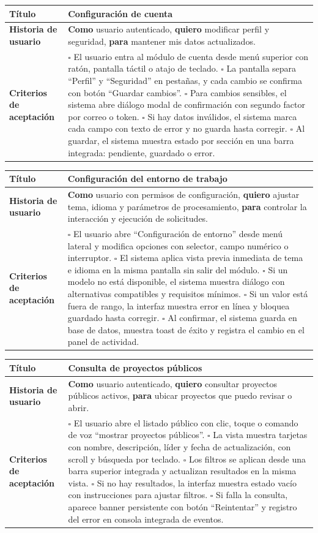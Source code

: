 \documentclass{article}
\newcommand{\story}[3]{
\begin{table}[H]
    \centering
    \begin{tabularx}{\textwidth}{| >{\raggedright\arraybackslash\bfseries\columncolor{leftheaderbg}}p{2.5cm} | >{\raggedright\arraybackslash\columncolor{contentbg}}X |}
        \hline
        Título & #1 \\
        \hline
        Historia de usuario & #2 \\
        \hline
        Criterios de aceptación & #3 \\
        \hline
    \end{tabularx}
\end{table}
}
\begin{document}
\story
{Configuración de cuenta}
{\textbf{Como} usuario autenticado, \textbf{quiero} modificar perfil y seguridad, \textbf{para} mantener mis datos actualizados.}
{$\square$ El usuario entra al módulo de cuenta desde menú superior con ratón, pantalla táctil o atajo de teclado. \newline
$\square$ La pantalla separa ``Perfil'' y ``Seguridad'' en pestañas, y cada cambio se confirma con botón ``Guardar cambios''. \newline
$\square$ Para cambios sensibles, el sistema abre diálogo modal de confirmación con segundo factor por correo o token. \newline
$\square$ Si hay datos inválidos, el sistema marca cada campo con texto de error y no guarda hasta corregir. \newline
$\square$ Al guardar, el sistema muestra estado por sección en una barra integrada: pendiente, guardado o error.}

\story
{Configuración del entorno de trabajo}
{\textbf{Como} usuario con permisos de configuración, \textbf{quiero} ajustar tema, idioma y parámetros de procesamiento, \textbf{para} controlar la interacción y ejecución de solicitudes.}
{$\square$ El usuario abre ``Configuración de entorno'' desde menú lateral y modifica opciones con selector, campo numérico o interruptor. \newline
$\square$ El sistema aplica vista previa inmediata de tema e idioma en la misma pantalla sin salir del módulo. \newline
$\square$ Si un modelo no está disponible, el sistema muestra diálogo con alternativas compatibles y requisitos mínimos. \newline
$\square$ Si un valor está fuera de rango, la interfaz muestra error en línea y bloquea guardado hasta corregir. \newline
$\square$ Al confirmar, el sistema guarda en base de datos, muestra toast de éxito y registra el cambio en el panel de actividad.}

\story
{Consulta de proyectos públicos}
{\textbf{Como} usuario autenticado, \textbf{quiero} consultar proyectos públicos activos, \textbf{para} ubicar proyectos que puedo revisar o abrir.}
{$\square$ El usuario abre el listado público con clic, toque o comando de voz ``mostrar proyectos públicos''. \newline
$\square$ La vista muestra tarjetas con nombre, descripción, líder y fecha de actualización, con scroll y búsqueda por teclado. \newline
$\square$ Los filtros se aplican desde una barra superior integrada y actualizan resultados en la misma vista. \newline
$\square$ Si no hay resultados, la interfaz muestra estado vacío con instrucciones para ajustar filtros. \newline
$\square$ Si falla la consulta, aparece banner persistente con botón ``Reintentar'' y registro del error en consola integrada de eventos.}
\end{document}

